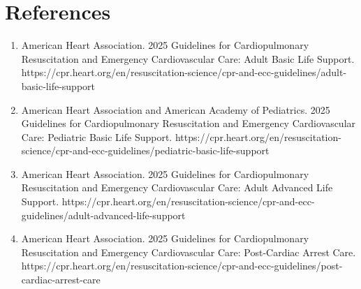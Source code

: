 \section*{References}
\begin{enumerate}
  \item American Heart Association. 2025 Guidelines for Cardiopulmonary Resuscitation and Emergency Cardiovascular Care: Adult Basic Life Support. https://cpr.heart.org/en/resuscitation-science/cpr-and-ecc-guidelines/adult-basic-life-support
  \item American Heart Association and American Academy of Pediatrics. 2025 Guidelines for Cardiopulmonary Resuscitation and Emergency Cardiovascular Care: Pediatric Basic Life Support. https://cpr.heart.org/en/resuscitation-science/cpr-and-ecc-guidelines/pediatric-basic-life-support
  \item American Heart Association. 2025 Guidelines for Cardiopulmonary Resuscitation and Emergency Cardiovascular Care: Adult Advanced Life Support. https://cpr.heart.org/en/resuscitation-science/cpr-and-ecc-guidelines/adult-advanced-life-support
  \item American Heart Association. 2025 Guidelines for Cardiopulmonary Resuscitation and Emergency Cardiovascular Care: Post-Cardiac Arrest Care. https://cpr.heart.org/en/resuscitation-science/cpr-and-ecc-guidelines/post-cardiac-arrest-care
\end{enumerate}

\clearpage

